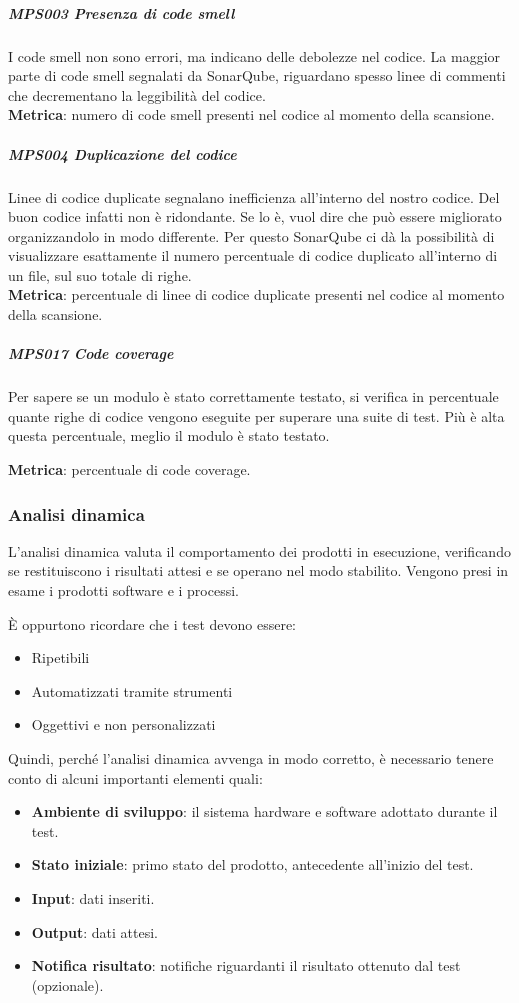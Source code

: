 			\subparagraph{MPS003 Presenza di code smell} \label{presenzacodesmell}
			I code smell non sono errori, ma indicano delle debolezze nel codice.
			La maggior parte di code smell segnalati da SonarQube, riguardano spesso linee di commenti che decrementano la leggibilità del codice.  \\
			\textbf{Metrica}: numero di code smell presenti nel codice al momento della scansione.

			\subparagraph{MPS004 Duplicazione del codice} \label{duplicazionecodice}
			Linee di codice duplicate segnalano inefficienza all'interno del nostro codice.
			Del buon codice infatti non è ridondante.
			Se lo è, vuol dire che può essere migliorato organizzandolo in modo differente.
			Per questo SonarQube ci dà la possibilità di visualizzare esattamente il numero percentuale di codice duplicato all'interno di un file, sul suo totale di righe. \\
			\textbf{Metrica}: percentuale di linee di codice duplicate presenti nel codice al momento della scansione.

            \subparagraph{MPS017 Code coverage} \label{codecoverage}
            Per sapere se un modulo è stato correttamente testato, si verifica in percentuale quante righe di codice vengono eseguite per superare una suite di test. Più è alta questa percentuale, meglio il modulo è stato testato.

            \textbf{Metrica}: percentuale di code coverage.

		\subsubsection{Analisi dinamica}\label{AnalisiDinamica}
		L'analisi dinamica valuta il comportamento dei prodotti in esecuzione, verificando se restituiscono i risultati attesi e se operano nel modo stabilito.
		Vengono presi in esame i prodotti software e i processi.

		È oppurtono ricordare che i test devono essere:
		\begin{itemize}
			\item Ripetibili
			\item Automatizzati tramite strumenti
			\item Oggettivi e non personalizzati
		\end{itemize}

		Quindi, perché l'analisi dinamica avvenga in modo corretto, è necessario tenere conto di alcuni importanti elementi quali:
		\begin{itemize}
			\item \textbf{Ambiente di sviluppo}: il sistema hardware e software adottato durante il test.
			\item \textbf{Stato iniziale}: primo stato del prodotto, antecedente all'inizio del test.
			\item \textbf{Input}: dati inseriti.
			\item \textbf{Output}: dati attesi.
			\item \textbf{Notifica risultato}: notifiche riguardanti il risultato ottenuto dal test (opzionale).
		\end{itemize}

